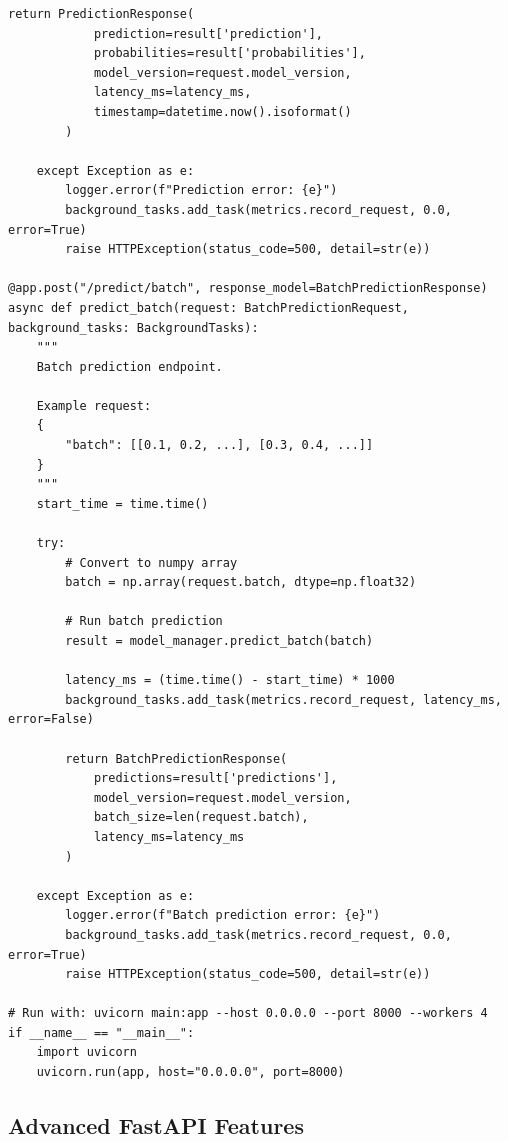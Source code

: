 \begin{lstlisting}[style=python, caption=Production-ready FastAPI model serving]
        return PredictionResponse(
            prediction=result['prediction'],
            probabilities=result['probabilities'],
            model_version=request.model_version,
            latency_ms=latency_ms,
            timestamp=datetime.now().isoformat()
        )

    except Exception as e:
        logger.error(f"Prediction error: {e}")
        background_tasks.add_task(metrics.record_request, 0.0, error=True)
        raise HTTPException(status_code=500, detail=str(e))

@app.post("/predict/batch", response_model=BatchPredictionResponse)
async def predict_batch(request: BatchPredictionRequest, background_tasks: BackgroundTasks):
    """
    Batch prediction endpoint.

    Example request:
    {
        "batch": [[0.1, 0.2, ...], [0.3, 0.4, ...]]
    }
    """
    start_time = time.time()

    try:
        # Convert to numpy array
        batch = np.array(request.batch, dtype=np.float32)

        # Run batch prediction
        result = model_manager.predict_batch(batch)

        latency_ms = (time.time() - start_time) * 1000
        background_tasks.add_task(metrics.record_request, latency_ms, error=False)

        return BatchPredictionResponse(
            predictions=result['predictions'],
            model_version=request.model_version,
            batch_size=len(request.batch),
            latency_ms=latency_ms
        )

    except Exception as e:
        logger.error(f"Batch prediction error: {e}")
        background_tasks.add_task(metrics.record_request, 0.0, error=True)
        raise HTTPException(status_code=500, detail=str(e))

# Run with: uvicorn main:app --host 0.0.0.0 --port 8000 --workers 4
if __name__ == "__main__":
    import uvicorn
    uvicorn.run(app, host="0.0.0.0", port=8000)
\end{lstlisting}

\subsection{Advanced FastAPI Features}

